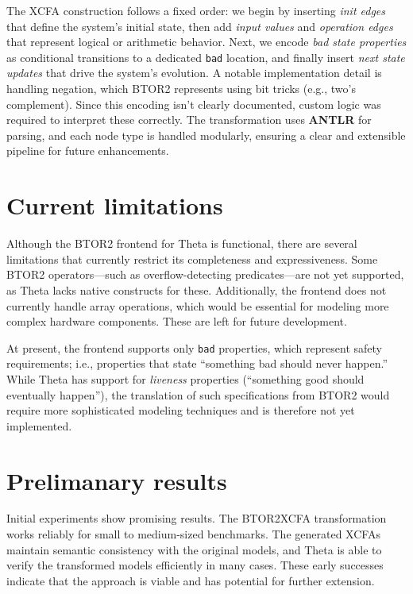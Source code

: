 The XCFA construction follows a fixed order: we begin by inserting \textit{init edges} that define the system's initial state, then add \textit{input values} and \textit{operation edges} that represent logical or arithmetic behavior. Next, we encode \textit{bad state properties} as conditional transitions to a dedicated \verb*|bad| location, and finally insert \textit{next state updates} that drive the system's evolution. A notable implementation detail is handling negation, which BTOR2 represents using bit tricks (e.g., two's complement). Since this encoding isn't clearly documented, custom logic was required to interpret these correctly. The transformation uses \textbf{ANTLR} for parsing, and each node type is handled modularly, ensuring a clear and extensible pipeline for future enhancements.\cite{antlr}

\section{Current limitations}
Although the BTOR2 frontend for Theta is functional, there are several limitations that currently restrict its completeness and expressiveness. Some BTOR2 operators—such as overflow-detecting predicates—are not yet supported, as Theta lacks native constructs for these. Additionally, the frontend does not currently handle array operations, which would be essential for modeling more complex hardware components. These are left for future development.

At present, the frontend supports only \texttt{bad} properties, which represent safety requirements; i.e., properties that state ``something bad should never happen.'' While Theta has support for \emph{liveness} properties (``something good should eventually happen''), the translation of such specifications from BTOR2 would require more sophisticated modeling techniques and is therefore not yet implemented.
 
\section{Prelimanary results}
Initial experiments show promising results. The BTOR2XCFA transformation works reliably for small to medium-sized benchmarks. The generated XCFAs maintain semantic consistency with the original models, and Theta is able to verify the transformed models efficiently in many cases. These early successes indicate that the approach is viable and has potential for further extension.

